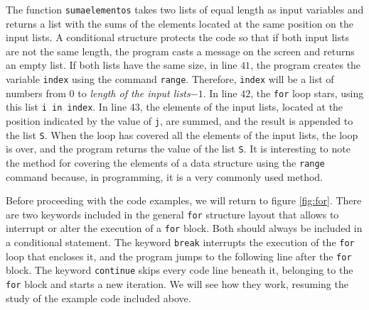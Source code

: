 \begin{paracol}{2}
The function \texttt{sumaelementos} takes two lists of equal length as input variables and returns a list with the sums of the elements located at the same position on the input lists. A conditional structure protects the code so that if both input lists are not the same length, the program casts a message on the screen and returns an empty list. If both lists have the same size, in line $41$, the program creates the variable \texttt{index} using the command \texttt{range}. Therefore, \texttt{index} will be a list of numbers from $0$ to \emph{length of the input lists}$- 1$. In line $42$, the \texttt{for} loop stars, using this list \texttt{i in index}. In line $43$, the elements of the input lists, located at the position indicated by the value of \texttt{j}, are summed, and the result is appended to the list \texttt{S}. When the loop has covered all the elements of the input lists, the loop is over, and the program returns the value of the list \texttt{S}. It is interesting to note the method for covering the elements of a data structure using the \texttt{range} command because, in programming, it is a very commonly used method.

Before proceeding with the code examples, we will return to figure \ref{fig:for}. There are two keywords included in the general \texttt{for} structure layout that allows to interrupt or alter the execution of a \texttt{for} block. Both should always be included in a conditional statement. The keyword \texttt{break} interrupts the execution of the \texttt{for} loop that encloses it, and the program jumps to the following line after the \texttt{for} block. The keyword \texttt{continue} skips every code line beneath it, belonging to the \texttt{for} block and starts a new iteration. We will see how they work, resuming the study of the example code included above. 


\end{paracol}
